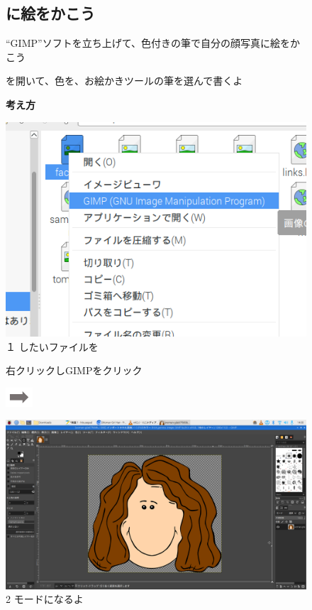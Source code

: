 \documentclass[a4paper,12pt]{jarticle}
\begin{document}
\begin{figure}[ht]
  \subsection{\theExercise {}に絵をかこう}

  \bigskip

  “GIMP”ソフトを立ち上げて、色付きの筆で自分の顔写真に絵をかこう

  を開いて、色を、お絵かきツールの筆を選んで書くよ

  \textbf{考え方}

  \begin{minipage}{\textwidth}
    \centering
    \begin{minipage}{0.45\linewidth}
      \includegraphics[width=\linewidth]{textbook-img124.png}\\
      １ したいファイルを

      右クリックしGIMPをクリック
    \end{minipage}
    \includegraphics[width=1cm]{textbook-img128.png}
    \begin{minipage}{0.45\linewidth}
      \includegraphics[width=\linewidth]{textbook-img125.png}\\
      2 モードになるよ
    \end{minipage}


\end{minipage}
\end{figure}
\end{document}
